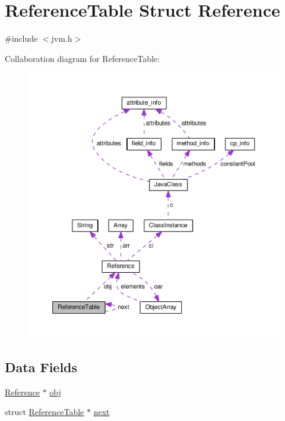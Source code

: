 \hypertarget{structReferenceTable}{}\section{Reference\+Table Struct Reference}
\label{structReferenceTable}


{\ttfamily \#include $<$jvm.\+h$>$}



Collaboration diagram for Reference\+Table\+:\nopagebreak
\begin{figure}[H]
\begin{center}
\leavevmode
\includegraphics[width=350pt]{structReferenceTable__coll__graph}
\end{center}
\end{figure}
\subsection*{Data Fields}
\begin{DoxyCompactItemize}
\item 
\hyperlink{structReference}{Reference} $\ast$ \hyperlink{structReferenceTable_a7730da3973b57f3c86c6007b9a90e7f8}{obj}
\item 
struct \hyperlink{structReferenceTable}{Reference\+Table} $\ast$ \hyperlink{structReferenceTable_aa640983e7b43b0062fad4ca7c4b16dd4}{next}
\end{DoxyCompactItemize}


